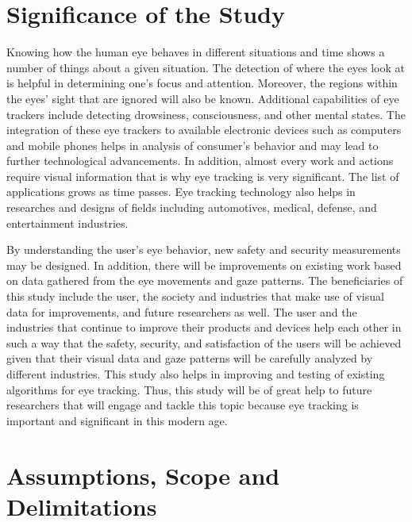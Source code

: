 \section{Significance of the Study}

Knowing how the human eye behaves in different situations and time shows a number of things about a given situation. The detection of where the eyes look at is helpful in determining one’s focus and attention. Moreover, the regions within the eyes’ sight that are ignored will also be known. Additional capabilities of eye trackers include detecting drowsiness, consciousness, and other mental states. The integration of these eye trackers to available electronic devices such as computers and mobile phones helps in analysis of consumer’s behavior and may lead to further technological advancements. In addition, almost every work and actions require visual information that is why eye tracking is very significant. The list of applications grows as time passes. Eye tracking technology also helps in researches and designs of fields including automotives, medical, defense, and entertainment industries. 

By understanding the user’s eye behavior, new safety and security measurements may be designed. In addition, there will be improvements on existing work based on data gathered from the eye movements and gaze patterns. The beneficiaries of this study include the user, the society and industries that make use of visual data for improvements, and future researchers as well. The user and the industries that continue to improve their products and devices help each other in such a way that the safety, security, and satisfaction of the users will be achieved given that their visual data and gaze patterns will be carefully analyzed by different industries. This study also helps in improving and testing of existing algorithms for eye tracking. Thus, this study will be of great help to future researchers that will engage and tackle this topic because eye tracking is important and significant in this modern age. 




\section{Assumptions, Scope and Delimitations}


